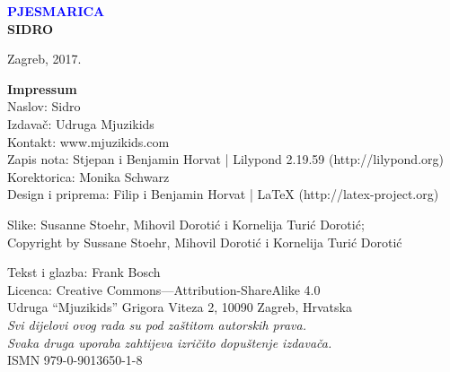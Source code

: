 \documentclass[a4paper,twoside, svgnames]{article}
\newcommand*{\titleTH}{\begingroup
\centering
\vspace*{5cm}

{\textcolor{Blue}{\fontsize{60}{70}\selectfont \textrm{\bfseries PJESMARICA}}}\\[\baselineskip]

{\fontsize{113}{123}\selectfont \textsf{\textbf{SIDRO}}}\par

\vfill %

{Zagreb, 2017.}\par %

\endgroup}
\begin{document}
\thispagestyle {empty}
\titleTH
\newpage
\begin{center}
\vspace*{\fill}
\begin{onehalfspacing}
\textbf{\textsf{Impressum}}\\
\vspace{5pt}
Naslov: Sidro\\
Izdavač: Udruga Mjuzikids\\
Kontakt: www.mjuzikids.com\\
Zapis nota: Stjepan i Benjamin Horvat | Lilypond 2.19.59 (http://lilypond.org)\\
Korektorica: Monika Schwarz\\
Design i priprema: Filip i Benjamin Horvat | LaTeX (http://latex-project.org)
\par
\begin{singlespacing}
\par
Slike: Susanne Stoehr, Mihovil Dorotić i Kornelija Turić Dorotić;\\ Copyright by Sussane Stoehr, Mihovil Dorotić i Kornelija Turić Dorotić\\
\par
\end{singlespacing}
Tekst i glazba: Frank Bosch\\
Licenca: Creative Commons—Attribution-ShareAlike 4.0\\
Udruga “Mjuzikids” Grigora Viteza 2, 10090 Zagreb, Hrvatska\\

\singlespacing
\textit{Svi dijelovi ovog rada su pod zaštitom autorskih prava.\\
Svaka druga uporaba zahtijeva izričito dopuštenje izdavača.}\\

\onehalfspacing
ISMN 979-0-9013650-1-8
\par
\end{onehalfspacing}
\end{center}
\newpage


\renewcommand\contentsname{Kazalo}
\tableofcontents
\newpage
\end{document}
